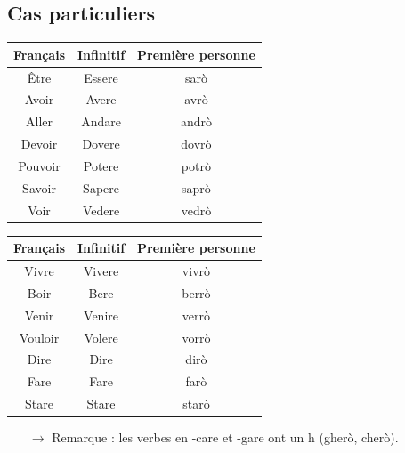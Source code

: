 \documentclass[12pt, openany]{report}
\begin{document}
\subsection{Cas particuliers}
\begin{minipage}{.478\textwidth}
    \begin{center}
        \begin{tabular}{c|c|c}
            Français & Infinitif & Première personne \\ \hline 
            Être & Essere & sarò\\ 
            Avoir & Avere & avrò\\
            Aller & Andare & andrò\\
            Devoir & Dovere & dovrò\\
            Pouvoir & Potere & potrò\\
            Savoir & Sapere & saprò\\
            Voir & Vedere & vedrò\\
            
        \end{tabular}
    \end{center}
\end{minipage}
\begin{minipage}{.478\textwidth}
    \begin{center}
        \begin{tabular}{c|c|c}
            Français & Infinitif & Première personne \\ \hline
            Vivre & Vivere & vivrò\\
            Boir & Bere & berrò\\
            Venir & Venire & verrò\\
            Vouloir & Volere & vorrò\\
            Dire & Dire & dirò\\
            Fare & Fare & farò\\
            Stare & Stare & starò\\
        \end{tabular}
    \end{center}
\end{minipage}
\begin{itemize}
    \item [$\to$] Remarque : les verbes en -care et -gare ont un h (gherò, cherò).
\end{itemize}
\end{document}
